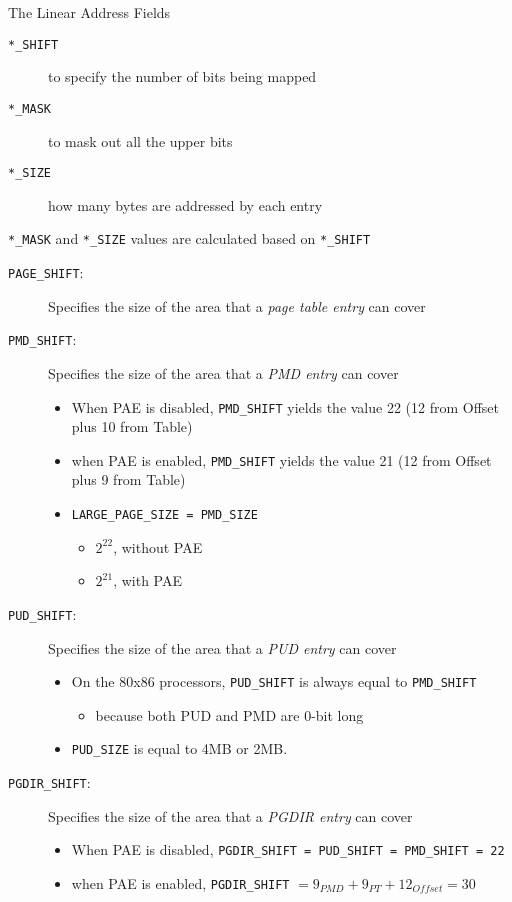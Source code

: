 \begin{frame}{The Linear Address Fields}
    \begin{center}
    \end{center}
  \begin{description}
  \item[\texttt{*\_SHIFT}] to specify the number of bits being mapped
  \item[\texttt{*\_MASK}] to mask out all the upper bits
  \item[\texttt{*\_SIZE}] how many bytes are addressed by each entry
  \end{description}
  \texttt{*\_MASK} and \texttt{*\_SIZE} values are calculated based on \texttt{*\_SHIFT}
\end{frame}

\begin{description}
\item[\texttt{PAGE\_SHIFT}:] Specifies the size of the area that a \emph{page table entry} can
  cover
\item[\texttt{PMD\_SHIFT}:] Specifies the size of the area that a \emph{PMD entry} can cover
  \begin{itemize}
  \item When PAE is disabled, \texttt{PMD\_SHIFT} yields the value 22 (12 from Offset plus 10 from
    Table)
  \item when PAE is enabled, \texttt{PMD\_SHIFT} yields the value 21 (12 from Offset plus 9 from
    Table)
  \item \texttt{LARGE\_PAGE\_SIZE = PMD\_SIZE}
    \begin{itemize}
    \item $2^{22}$, without PAE
    \item $2^{21}$, with PAE
    \end{itemize}
  \end{itemize}
\item[\texttt{PUD\_SHIFT}:] Specifies the size of the area that a \emph{PUD entry} can cover
  \begin{itemize}
  \item On the 80x86 processors, \texttt{PUD\_SHIFT} is always equal to \texttt{PMD\_SHIFT}
    \begin{itemize}
    \item because both PUD and PMD are 0-bit long
    \end{itemize}
  \item \texttt{PUD\_SIZE} is equal to 4MB or 2MB.
  \end{itemize}
\item[\texttt{PGDIR\_SHIFT}:] Specifies the size of the area that a \emph{PGDIR entry} can cover
  \begin{itemize}
  \item When PAE is disabled, \texttt{PGDIR\_SHIFT = PUD\_SHIFT = PMD\_SHIFT = 22}
  \item when PAE is enabled, \texttt{PGDIR\_SHIFT} $= 9_{PMD} + 9_{PT} + 12_{Offset} = 30$
  \end{itemize}
\end{description}

